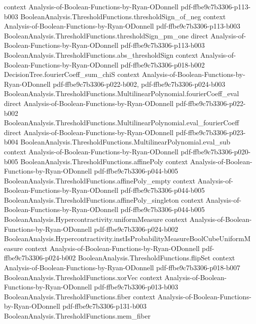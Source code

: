 \begin{theorem}
  {context}
  {Analysis-of-Boolean-Functions-by-Ryan-ODonnell}
  {pdf-ffbe9c7b3306-p113-b003}
\proofstep
  {BooleanAnalysis.ThresholdFunctions.thresholdSign_of_neg}
  {context}
  {Analysis-of-Boolean-Functions-by-Ryan-ODonnell}
  {pdf-ffbe9c7b3306-p113-b003}
\proofstep
  {BooleanAnalysis.ThresholdFunctions.thresholdSign_pm_one}
  {direct}
  {Analysis-of-Boolean-Functions-by-Ryan-ODonnell}
  {pdf-ffbe9c7b3306-p113-b003}
\proofstep
  {BooleanAnalysis.ThresholdFunctions.abs_thresholdSign}
  {context}
  {Analysis-of-Boolean-Functions-by-Ryan-ODonnell}
  {pdf-ffbe9c7b3306-p018-b002}
\proofstep
  {DecisionTree.fourierCoeff_sum_chiS}
  {context}
  {Analysis-of-Boolean-Functions-by-Ryan-ODonnell}
  {pdf-ffbe9c7b3306-p022-b002,
    pdf-ffbe9c7b3306-p024-b003}
\proofstep
  {BooleanAnalysis.ThresholdFunctions.MultilinearPolynomial.fourierCoeff_eval}
  {direct}
  {Analysis-of-Boolean-Functions-by-Ryan-ODonnell}
  {pdf-ffbe9c7b3306-p022-b002}
\proofstep
  {BooleanAnalysis.ThresholdFunctions.MultilinearPolynomial.eval_fourierCoeff}
  {direct}
  {Analysis-of-Boolean-Functions-by-Ryan-ODonnell}
  {pdf-ffbe9c7b3306-p023-b004}
\proofstep
  {BooleanAnalysis.ThresholdFunctions.MultilinearPolynomial.eval_sub}
  {context}
  {Analysis-of-Boolean-Functions-by-Ryan-ODonnell}
  {pdf-ffbe9c7b3306-p020-b005}
\proofstep
  {BooleanAnalysis.ThresholdFunctions.affinePoly}
  {context}
  {Analysis-of-Boolean-Functions-by-Ryan-ODonnell}
  {pdf-ffbe9c7b3306-p044-b005}
\proofstep
  {BooleanAnalysis.ThresholdFunctions.affinePoly_empty}
  {context}
  {Analysis-of-Boolean-Functions-by-Ryan-ODonnell}
  {pdf-ffbe9c7b3306-p044-b005}
\proofstep
  {BooleanAnalysis.ThresholdFunctions.affinePoly_singleton}
  {context}
  {Analysis-of-Boolean-Functions-by-Ryan-ODonnell}
  {pdf-ffbe9c7b3306-p044-b005}
\proofstep
  {BooleanAnalysis.Hypercontractivity.uniformMeasure}
  {context}
  {Analysis-of-Boolean-Functions-by-Ryan-ODonnell}
  {pdf-ffbe9c7b3306-p024-b002}
\proofstep
  {BooleanAnalysis.Hypercontractivity.instIsProbabilityMeasureBoolCubeUniformMeasure}
  {context}
  {Analysis-of-Boolean-Functions-by-Ryan-ODonnell}
  {pdf-ffbe9c7b3306-p024-b002}
\proofstep
  {BooleanAnalysis.ThresholdFunctions.flipSet}
  {context}
  {Analysis-of-Boolean-Functions-by-Ryan-ODonnell}
  {pdf-ffbe9c7b3306-p018-b007}
\proofstep
  {BooleanAnalysis.ThresholdFunctions.xorVec}
  {context}
  {Analysis-of-Boolean-Functions-by-Ryan-ODonnell}
  {pdf-ffbe9c7b3306-p013-b003}
\proofstep
  {BooleanAnalysis.ThresholdFunctions.fiber}
  {context}
  {Analysis-of-Boolean-Functions-by-Ryan-ODonnell}
  {pdf-ffbe9c7b3306-p131-b003}
\proofstep
  {BooleanAnalysis.ThresholdFunctions.mem_fiber}

\end{theorem}
